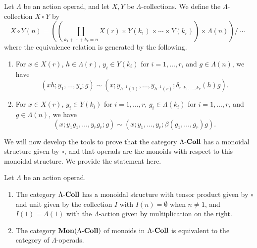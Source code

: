 \begin{Defi}\label{Defi:sub-prod}
Let $\Lambda$ be an action operad, and let $X, Y$ be $\Lambda$-collections. We define the $\Lambda$-collection $X \circ Y$ by
  \[
    X \circ Y (n) = \left(\left( \coprod_{k_{1} + \cdots + k_{r} = n} X(r) \times Y(k_{1}) \times \cdots \times Y(k_{r}) \right) \times \Lambda(n)\right) / \sim
  \]
where the equivalence relation is generated by the following.
\begin{enumerate}
\item For $x \in X(r)$, $h \in \Lambda(r)$, $y_i \in Y(k_i)$ for $i = 1, \ldots, r$, and $g \in \Lambda(n)$, we have
\[
 \left(xh; y_{1}, \ldots, y_{r}; g\right) \sim \left(x; y_{h^{-1}(1)}, \ldots, y_{h^{-1}(r)}; \delta_{r; k_1, \ldots, k_r}(h)g\right).
\]
\item For $x \in X(r)$, $y_{i} \in Y(k_{i})$ for $i = 1, \ldots, r$, $g_{i} \in \Lambda(k_{i})$  for $i = 1, \ldots, r$, and $g \in \Lambda(n)$, we have
\[
 \left(x; y_{1}g_{1}, \ldots, y_{r}g_{r}; g\right) \sim \left(x; y_{1}, \ldots, y_{r}; \beta(g_{1}, \ldots, g_{r})g\right).
\]
\end{enumerate}
%   
\end{Defi}


We will now develop the tools to prove that the category $\Lambda\mathbf{\mbox{-}Coll}$ has a monoidal structure given by $\circ$, and that operads are the monoids with respect to this monoidal structure.
We provide the statement here.

\begin{thm}\label{thm:operad=monoid}
Let $\Lambda$ be an action operad.
  \begin{enumerate}
    \item The category $\Lambda\mathbf{\mbox{-}Coll}$ has a monoidal structure with tensor product given by $\circ$ and unit given by the collection $I$ with $I(n) = \emptyset$ when $n \neq 1$, and $I(1) = \Lambda(1)$ with the $\Lambda$-action given by multiplication on the right.
    \item The category $\mathbf{Mon}(\Lambda\mathbf{\mbox{-}Coll})$ of monoids in $\Lambda\mathbf{\mbox{-}Coll}$ is equivalent to the category of $\Lambda$-operads.
  \end{enumerate}
\end{thm}

